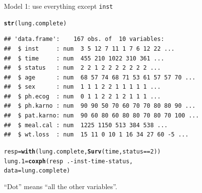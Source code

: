 \documentclass[unknownkeysallowed]{beamer}\usepackage[]{graphicx}\usepackage[]{color}
\makeatletter
\newcommand{\hlnum}[1]{\textcolor[rgb]{0.686,0.059,0.569}{#1}}%
\newcommand{\hlopt}[1]{\textcolor[rgb]{0,0,0}{#1}}%
\newcommand{\hlstd}[1]{\textcolor[rgb]{0.345,0.345,0.345}{#1}}%
\newcommand{\hlkwb}[1]{\textcolor[rgb]{0.69,0.353,0.396}{#1}}%
\newcommand{\hlkwc}[1]{\textcolor[rgb]{0.333,0.667,0.333}{#1}}%
\newcommand{\hlkwd}[1]{\textcolor[rgb]{0.737,0.353,0.396}{\textbf{#1}}}%
\newenvironment{kframe}{%
 \def\at@end@of@kframe{}%
 \ifinner\ifhmode%
  \def\at@end@of@kframe{\end{minipage}}%
  \begin{minipage}{\columnwidth}%
 \fi\fi%
 \def\FrameCommand##1{\hskip\@totalleftmargin \hskip-\fboxsep
 \colorbox{shadecolor}{##1}\hskip-\fboxsep
     \hskip-\linewidth \hskip-\@totalleftmargin \hskip\columnwidth}%
 \MakeFramed {\advance\hsize-\width
   \@totalleftmargin\z@ \linewidth\hsize
   \@setminipage}}%
 {\par\unskip\endMakeFramed%
 \at@end@of@kframe}
\newenvironment{knitrout}{}{} %
\makeatother
\begin{document}
\begin{frame}[fragile]{Model 1: use everything except \texttt{inst}}

 
\begin{knitrout}\footnotesize
{}\color{fgcolor}\begin{kframe}
\begin{alltt}
\hlkwd{str}\hlstd{(lung.complete)}
\end{alltt}
\begin{verbatim}
## 'data.frame':	167 obs. of  10 variables:
##  $ inst     : num  3 5 12 7 11 1 7 6 12 22 ...
##  $ time     : num  455 210 1022 310 361 ...
##  $ status   : num  2 2 1 2 2 2 2 2 2 2 ...
##  $ age      : num  68 57 74 68 71 53 61 57 57 70 ...
##  $ sex      : num  1 1 1 2 2 1 1 1 1 1 ...
##  $ ph.ecog  : num  0 1 1 2 2 1 2 1 1 1 ...
##  $ ph.karno : num  90 90 50 70 60 70 70 80 80 90 ...
##  $ pat.karno: num  90 60 80 60 80 80 70 80 70 100 ...
##  $ meal.cal : num  1225 1150 513 384 538 ...
##  $ wt.loss  : num  15 11 0 10 1 16 34 27 60 -5 ...
\end{verbatim}
\end{kframe}
\end{knitrout}


\begin{knitrout}
\color{fgcolor}\begin{kframe}
\begin{alltt}
\hlstd{resp}\hlkwb{=}\hlkwd{with}\hlstd{(lung.complete,}\hlkwd{Surv}\hlstd{(time,status}\hlopt{==}\hlnum{2}\hlstd{))}
\hlstd{lung.1}\hlkwb{=}\hlkwd{coxph}\hlstd{(resp}\hlopt{~}\hlstd{.}\hlopt{-}\hlstd{inst}\hlopt{-}\hlstd{time}\hlopt{-}\hlstd{status,}
  \hlkwc{data}\hlstd{=lung.complete)}
\end{alltt}
\end{kframe}
\end{knitrout}

``Dot'' means ``all the other variables''.


\end{frame}
\end{document}
